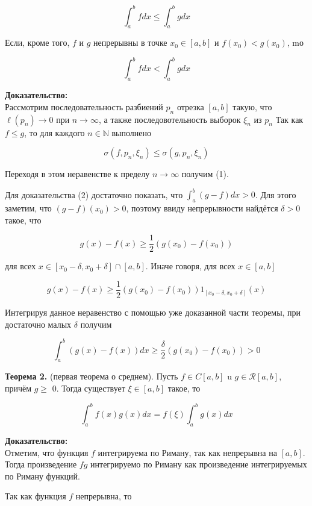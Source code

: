 \documentclass[a4paper,12pt]{article} %
\begin{document}
	$$
	\int_{a}^{b} f d x \leq \int_{a}^{b} g d x
	$$
	
	Если, кроме того, $f$ и $g$ непрерывны в точке $x_{0} \in[a, b]$ и $f\left(x_{0}\right)<g\left(x_{0}\right)$, mо
	
	$$
	\int_{a}^{b} f d x<\int_{a}^{b} g d x
	$$
	
	\textbf{Доказательство:\\}
	Рассмотрим последовательность разбиений $p_{n}$ отрезка $[a, b]$ такую, что $\ell\left(p_{n}\right) \rightarrow 0$ при $n \rightarrow \infty$, а также последовотельность выборок $\xi_{n}$ из $p_{n}$ Так как $f \leq g$, то для каждого $n \in \mathbb{N}$ выполнено
	
	$$
	\sigma\left(f, p_{n}, \xi_{n}\right) \leq \sigma\left(g, p_{n}, \xi_{n}\right)
	$$
	
	Переходя в этом неравенстве к пределу $n \rightarrow \infty$ получим (1).
	
	Для доказательства (2) достаточно показать, что $\int_{a}^{b}(g-f) d x>0$. Для этого заметим, что $(g-f)\left(x_{0}\right)>0$, поэтому ввиду непрерывности найдётся $\delta>0$ такое, что
	
	$$
	g(x)-f(x) \geq \frac{1}{2}\left(g\left(x_{0}\right)-f\left(x_{0}\right)\right)
	$$
	
	для всех $x \in\left[x_{0}-\delta, x_{0}+\delta\right] \cap[a, b]$. Иначе говоря, для всех $x \in[a, b]$
	
	$$
	g(x)-f(x) \geq \frac{1}{2}\left(g\left(x_{0}\right)-f\left(x_{0}\right)\right) 1_{\left[x_{0}-\delta, x_{0}+\delta\right]}(x)
	$$
	
	Интегрируя данное неравенство с помощью уже доказанной части теоремы, при достаточно малых $\delta$ получим
	
	$$
	\int_{a}^{b}(g(x)-f(x)) d x \geq \frac{\delta}{2}\left(g\left(x_{0}\right)-f\left(x_{0}\right)\right)>0
	$$
	
	\textbf{Теорема 2.} (первая теорема о среднем). Пусть $f \in C[a, b]$ u $g \in \mathcal{R}[a, b]$, причём $g \geq$ 0. Тогда существует $\xi \in[a, b]$ такое, то
	
	$$
	\int_{a}^{b} f(x) g(x) d x=f(\xi) \int_{a}^{b} g(x) d x
	$$
	
	\textbf{Доказательство:\\}
	Отметим, что функция $f$ интегрируема по Риману, так как непрерывна на $[a, b]$. Тогда произведение $f g$ интегрируемо по Риману как произведение интегрируемых по Риману функций.
	
	Так как функция $f$ непрерывна, то
	
\end{document}
